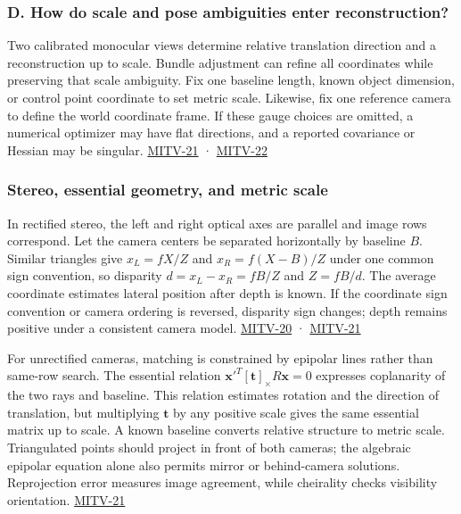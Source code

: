 \subsubsection{D. How do scale and pose ambiguities enter reconstruction?}\label{d.-how-do-scale-and-pose-ambiguities-enter-reconstruction}

Two calibrated monocular views determine relative translation direction and a reconstruction up to scale. Bundle adjustment can refine all coordinates while preserving that scale ambiguity. Fix one baseline length, known object dimension, or control point coordinate to set metric scale. Likewise, fix one reference camera to define the world coordinate frame. If these gauge choices are omitted, a numerical optimizer may have flat directions, and a reported covariance or Hessian may be singular. \hyperref[04-visual-computing-ii-ch036]{MITV-21} · \hyperref[04-visual-computing-ii-ch036]{MITV-22}

\subsubsection{Stereo, essential geometry, and metric scale}\label{stereo-essential-geometry-and-metric-scale}

In rectified stereo, the left and right optical axes are parallel and image rows correspond. Let the camera centers be separated horizontally by baseline \(B\). Similar triangles give \(x_L=fX/Z\) and \(x_R=f(X-B)/Z\) under one common sign convention, so disparity \(d=x_L-x_R=fB/Z\) and \(Z=fB/d\). The average coordinate estimates lateral position after depth is known. If the coordinate sign convention or camera ordering is reversed, disparity sign changes; depth remains positive under a consistent camera model. \hyperref[04-visual-computing-ii-ch036]{MITV-20} · \hyperref[04-visual-computing-ii-ch036]{MITV-21}

For unrectified cameras, matching is constrained by epipolar lines rather than same-row search. The essential relation \(\mathbf{x}'^T[\mathbf t]_\times R\mathbf{x}=0\) expresses coplanarity of the two rays and baseline. This relation estimates rotation and the direction of translation, but multiplying \(\mathbf t\) by any positive scale gives the same essential matrix up to scale. A known baseline converts relative structure to metric scale. Triangulated points should project in front of both cameras; the algebraic epipolar equation alone also permits mirror or behind-camera solutions. Reprojection error measures image agreement, while cheirality checks visibility orientation. \hyperref[04-visual-computing-ii-ch036]{MITV-21}

